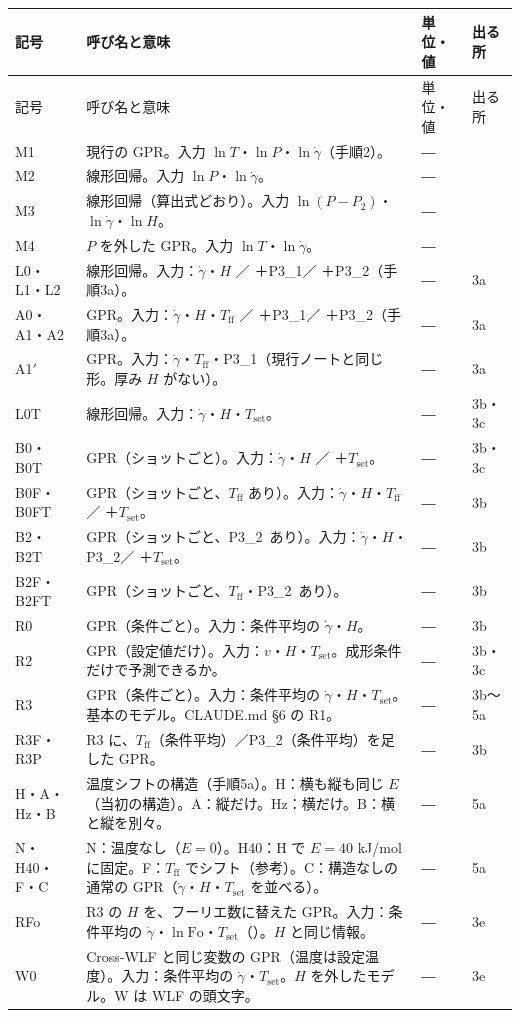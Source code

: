 \documentclass[paper=a4paper,fontsize=10.5pt,line_length=44zw,number_of_lines=38]{jlreq}
\makeatletter
\newcommand{\file}[1]{\texttt{\detokenize{#1}}}
\newcommand{\gd}{\dot{\gamma}}
\newcommand{\Tff}{T_{\mathrm{ff}}}
\newcommand{\Tset}{T_{\mathrm{set}}}
\newcommand{\PI}{P3\_1}
\newcommand{\PII}{P3\_2}
\newenvironment{symtab}{%
  \begin{longtable}{@{}>{\raggedright\arraybackslash}p{6.5\zw}>{\raggedright\arraybackslash}p{22\zw}>{\raggedright\arraybackslash}p{6\zw}>{\raggedright\arraybackslash}p{4.5\zw}@{}}
  \toprule 記号 & 呼び名と意味 & 単位・値 & 出る所 \\ \midrule \endfirsthead
  \toprule 記号 & 呼び名と意味 & 単位・値 & 出る所 \\ \midrule \endhead
  \bottomrule \endlastfoot}{\end{longtable}}
\makeatother
\begin{document}
\begin{symtab}
M1 & 現行の GPR。入力 $\ln T$・$\ln P$・$\ln\gd$（手順2）。 & ― & 2 \\
M2 & 線形回帰。入力 $\ln P$・$\ln\gd$。 & ― & 2 \\
M3 & 線形回帰（算出式どおり）。入力 $\ln(P-P_2)$・$\ln\gd$・$\ln H$。 & ― & 2 \\
M4 & $P$ を外した GPR。入力 $\ln T$・$\ln\gd$。 & ― & 2 \\
L0・L1・L2 & 線形回帰。入力：$\gd$・$H$ ／ ＋\PI ／ ＋\PII（手順3a）。 & ― & 3a \\
A0・A1・A2 & GPR。入力：$\gd$・$H$・$\Tff$ ／ ＋\PI ／ ＋\PII（手順3a）。 & ― & 3a \\
A1$'$ & GPR。入力：$\gd$・$\Tff$・\PI（現行ノートと同じ形。厚み $H$ がない）。 & ― & 3a \\
L0T & 線形回帰。入力：$\gd$・$H$・$\Tset$。 & ― & 3b・3c \\
B0・B0T & GPR（ショットごと）。入力：$\gd$・$H$ ／ ＋$\Tset$。 & ― & 3b・3c \\
B0F・B0FT & GPR（ショットごと、$\Tff$ あり）。入力：$\gd$・$H$・$\Tff$ ／ ＋$\Tset$。 & ― & 3b \\
B2・B2T & GPR（ショットごと、\PII\ あり）。入力：$\gd$・$H$・\PII ／ ＋$\Tset$。 & ― & 3b \\
B2F・B2FT & GPR（ショットごと、$\Tff$・\PII\ あり）。 & ― & 3b \\
R0 & GPR（条件ごと）。入力：条件平均の $\gd$・$H$。 & ― & 3b \\
R2 & GPR（設定値だけ）。入力：$v$・$H$・$\Tset$。成形条件だけで予測できるか。 & ― & 3b・3c \\
R3 & GPR（条件ごと）。入力：条件平均の $\gd$・$H$・$\Tset$。基本のモデル。CLAUDE.md §6 の R1。 & ― & 3b〜5a \\
R3F・R3P & R3 に、$\Tff$（条件平均）／\PII（条件平均）を足した GPR。 & ― & 3b \\
H・A・Hz・B & 温度シフトの構造（手順5a）。H：横も縦も同じ $E$（当初の構造）。A：縦だけ。Hz：横だけ。B：横と縦を別々。 & ― & 5a \\
N・H40・F・C & N：温度なし（$E=0$）。H40：H で $E=40$ kJ/mol に固定。F：$\Tff$ でシフト（参考）。C：構造なしの通常の GPR（$\gd$・$H$・$\Tset$ を並べる）。 & ― & 5a \\
RFo & R3 の $H$ を、フーリエ数に替えた GPR。入力：条件平均の $\gd$・$\ln\mathrm{Fo}$・$\Tset$（\file{ln_Fo_cm}）。$H$ と同じ情報。 & ― & 3e \\
W0 & Cross-WLF と同じ変数の GPR（温度は設定温度）。入力：条件平均の $\gd$・$\Tset$。$H$ を外したモデル。W は WLF の頭文字。 & ― & 3e \\

\end{symtab}
\end{document}
